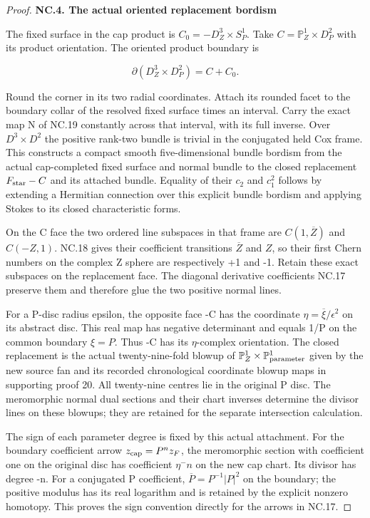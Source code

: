 \begin{proof}
\par

\medskip\noindent\textbf{NC.4. The actual oriented replacement bordism}

\par\nobreak

The fixed surface in the cap product is \(C_{0}=-D^3_Z\times S^1_P\). Take
\(C=\mathbb P^1_Z\times D^2_P\) with its product orientation. The oriented product
boundary is

\[
 \partial(D^3_Z\times D^2_P)=C+C_0.                    \tag{NC.20}
\]

Round the corner in its two radial coordinates. Attach its rounded
facet to the boundary collar of the resolved fixed surface times an
interval. Carry the exact map N of NC.19 constantly across that
interval, with its full inverse. Over \(D^3\times D^2\) the positive
rank-two bundle is trivial in the conjugated held Cox frame. This
constructs a compact smooth five-dimensional bundle bordism from
the actual cap-completed fixed surface and normal bundle to the
closed replacement \(F_{\rm star}-C\) and its attached bundle. Equality of
their \(c_2\) and \(c_1^2\) follows by extending a Hermitian connection
over this explicit bundle bordism and applying Stokes to its closed
characteristic forms.

On the C face the two ordered line subspaces in that frame are
\(C(1,\overline{Z})\) and \(C(-Z,1)\). NC.18 gives their coefficient transitions
\(\overline{Z}\) and \(Z\), so their first Chern numbers on the complex Z sphere
are respectively +1 and -1. Retain these exact subspaces on the
replacement face. The diagonal derivative coefficients NC.17
preserve them and therefore glue the two positive normal lines.

For a P-disc radius epsilon, the opposite face -C has the coordinate
\(\eta=\overline{\xi}/\epsilon^{2}\) on its abstract disc. This real map has negative
determinant and equals 1/P on the common boundary \(\xi=P\). Thus -C
has its \(\eta\)-complex orientation. The closed replacement is the
actual twenty-nine-fold blowup of \(\mathbb P^1_Z\times \mathbb P^1_{\rm parameter}\) given by the
new source fan and its recorded chronological coordinate blowup maps in supporting proof 20.
All twenty-nine centres lie in the original P disc. The meromorphic normal
dual sections and their chart inverses determine the divisor lines
on these blowups; they are retained for the separate intersection
calculation.

The sign of each parameter degree is fixed by this actual attachment.
For the boundary coefficient arrow \(z_{\rm cap}=P^n z_F\), the meromorphic
section with coefficient one on the original disc has coefficient
\(\eta^-n\) on the new cap chart. Its divisor has degree -n. For a
conjugated P coefficient, \(\overline{P}=P^{-1} |P|^{2}\) on the boundary; the
positive modulus has its real logarithm and is retained by the
explicit nonzero homotopy. This proves the sign convention directly
for the arrows in NC.17.


\end{proof}
